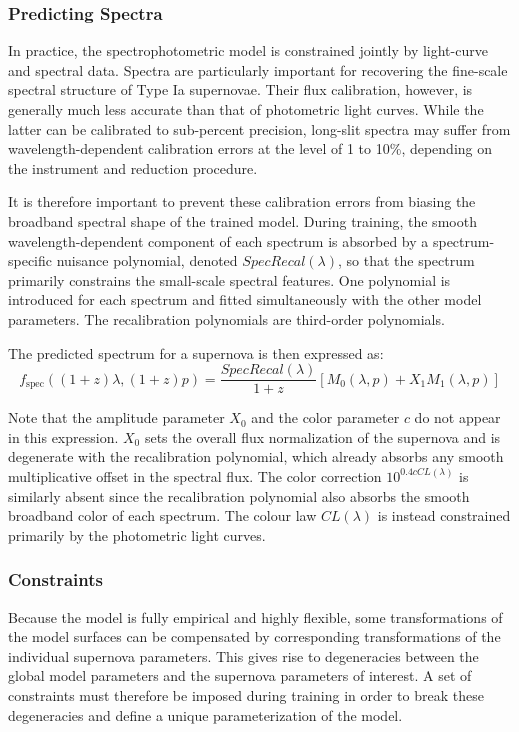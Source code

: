 \subsubsection{Predicting Spectra} 


In practice, the spectrophotometric model is constrained jointly by 
light-curve and spectral data. Spectra are particularly important for 
recovering the fine-scale spectral structure of Type Ia supernovae. 
Their flux calibration, however, is generally much less accurate than 
that of photometric light curves. While the latter can be calibrated 
to sub-percent precision, long-slit spectra may suffer from 
wavelength-dependent calibration errors at the level of 1 to 10\%, 
depending on the instrument and reduction procedure. 

It is therefore important to prevent these calibration errors from 
biasing the broadband spectral shape of the trained model. During 
training, the smooth wavelength-dependent component of each spectrum 
is absorbed by a spectrum-specific nuisance polynomial, denoted $SpecRecal(\lambda)$, so that the 
spectrum primarily constrains the small-scale spectral features. One 
polynomial is introduced for each spectrum and fitted simultaneously 
with the other model parameters. The recalibration polynomials are 
third-order polynomials. 

The predicted spectrum for a supernova is then expressed as:
\begin{equation}
    f_{\text{spec}}((1+z)\lambda, (1+z)p) = \frac{SpecRecal(\lambda)}{1+z} [M_0(\lambda,p) + X_1M_1(\lambda, p)]
\end{equation}

Note that the amplitude parameter $X_0$ and the color parameter $c$ 
do not appear in this expression. $X_0$ sets the overall flux 
normalization of the supernova and is degenerate with the 
recalibration polynomial, which already 
absorbs any smooth multiplicative offset in the spectral flux. The 
color correction $10^{0.4cCL(\lambda)}$ is similarly absent 
since the recalibration polynomial also absorbs the smooth broadband 
color of each spectrum. The colour law $CL(\lambda)$ is instead 
constrained primarily by the photometric light curves.

\subsubsection{Constraints}

Because the model is fully empirical and highly flexible, some 
transformations of the model surfaces can be compensated by 
corresponding transformations of the individual supernova parameters. 
This gives rise to degeneracies between the global model parameters 
and the supernova parameters of interest. A set of constraints must 
therefore be imposed during training in order to break these 
degeneracies and define a unique parameterization of the model. \\

